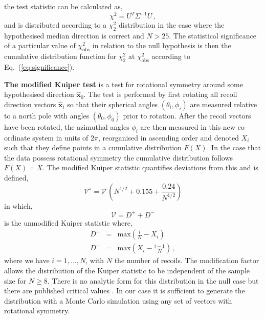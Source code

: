 the test statistic can be calculated as,
\begin{equation}
      \chi^2 = U^T \Sigma^{-1} U \, ,
\end{equation}
and is distributed according to a $\chi^2_2$ distribution in the case where the hypothesised median direction is correct and $N>25$. The statistical significance of a particular value of $\chi^2_\textrm{obs}$ in relation to the null hypothesis is then the cumulative distribution function for $\chi^2_2$ at $\chi^2_\textrm{obs}$ according to Eq.~(\ref{eq:significance}).

{\bf The modified Kuiper test} is a test for rotational symmetry around some hypothesised direction $\hat{\textbf{x}}_0$. The test is performed by first rotating all recoil direction vectors $\hat{\textbf{x}}_i$ so that their spherical angles $(\theta_i,\phi_i)$ are measured relative to a north pole with angles $(\theta_0,\phi_0)$ prior to rotation. After the recoil vectors have been rotated, the azimuthal angles $\phi_i$ are then measured in this new co-ordinate system in units of $2\pi$, reorganised in ascending order and denoted $X_i$ such that they define points in a cumulative distribution $F(X)$. In the case that the data possess rotational symmetry the cumulative distribution follows $F(X) = X$. The modified Kuiper statistic quantifies deviations from this and is defined,
\begin{equation}
      \mathcal{V}^\star = \mathcal{V} \, \left(N^{1/2} + 0.155 + \frac{0.24}{N^{1/2}}\right)
\end{equation}
in which,
\begin{equation}
      \mathcal{V} = D^{+} + D^{-}
\end{equation}
is the unmodified Kuiper statistic where,
\begin{eqnarray}
      D^{+} &=& \textrm{max}\left(\frac{i}{N} - X_i\right) \\
      D^{-} &=& \textrm{max}\left(X_i - \frac{i-1}{N}\right) \, ,
\end{eqnarray}
where we have $i = 1, ..., N$, with $N$ the number of recoils. The modification factor allows the distribution of the Kuiper statistic to be independent of the sample size for $N\geq8$. There is no analytic form for this distribution in the null case but there are published critical values \cite{fisher1987statistical}. In our case it is sufficient to generate the distribution with a Monte Carlo simulation using any set of vectors with rotational symmetry.

